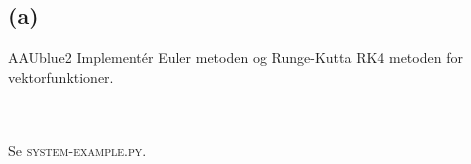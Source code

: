 \subsection*{(a) }
%
%
\begin{color}{AAUblue2}
%
Implementér Euler metoden og Runge-Kutta RK4 metoden for vektorfunktioner. 
% 
\end{color}
\\\\
% 
Se \textsc{system-example.py}.
%